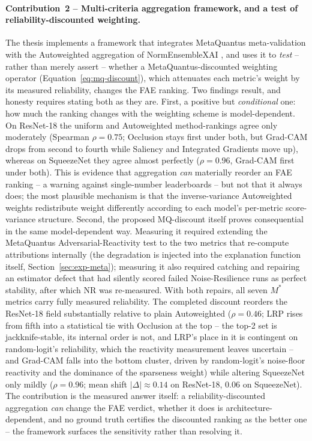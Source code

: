 \paragraph{Contribution~2 -- Multi-criteria aggregation framework, and a test
of reliability-discounted weighting.}
The thesis implements a framework that integrates MetaQuantus meta-validation
\citep{hedstrom2024metaquantus} with the Autoweighted aggregation of
NormEnsembleXAI \citep{hryniewska2024normensemblexai}, and uses it to
\emph{test} -- rather than merely assert -- whether a MetaQuantus-discounted
weighting operator (Equation~\eqref{eq:mq-discount}), which attenuates each
metric's weight by its measured reliability, changes the FAE ranking. Two
findings result, and honesty requires stating both as they are. First, a
positive but \emph{conditional} one: how much the ranking changes with the
weighting scheme is model-dependent. On ResNet-18 the uniform and Autoweighted
method-rankings agree only moderately (Spearman $\rho = 0.75$; Occlusion stays
first under both, but Grad-CAM drops from second to fourth while Saliency and
Integrated Gradients move up), whereas on SqueezeNet they
agree almost perfectly ($\rho = 0.96$, Grad-CAM first under both). This is
evidence that aggregation \emph{can} materially reorder an FAE ranking -- a
warning against
single-number leaderboards -- but not that it always does; the most plausible
mechanism is that the inverse-variance Autoweighted weights redistribute weight
differently according to each model's per-metric score-variance structure.
Second, the proposed MQ-discount itself proves consequential in the same
model-dependent way. Measuring it required extending the MetaQuantus
Adversarial-Reactivity test to the two metrics that re-compute attributions
internally (the degradation is injected into the explanation function
itself, Section~\ref{sec:exp-meta}); measuring it also required catching
and repairing an estimator defect that had silently scored failed
Noise-Resilience runs as perfect stability, after which NR was re-measured.
With both repairs, all seven $M^{*}$
metrics carry fully measured reliability. The completed
discount reorders the
ResNet-18 field substantially relative to plain Autoweighted
($\rho = 0.46$; LRP rises from fifth into a statistical tie with Occlusion
at the top -- the top-2 set is jackknife-stable, its internal order is not,
and LRP's place in it is contingent on random-logit's reliability, which
the reactivity measurement leaves uncertain -- and Grad-CAM falls into the
bottom cluster, driven by
random-logit's noise-floor reactivity and the dominance of the
sparseness weight) while altering SqueezeNet
only mildly ($\rho = 0.96$; mean shift $|\Delta|\approx0.14$ on
ResNet-18, $0.06$ on SqueezeNet). The
contribution is the measured answer itself: a reliability-discounted
aggregation \emph{can} change the FAE verdict, whether it does is
architecture-dependent, and no ground truth certifies the discounted ranking
as the better one -- the framework surfaces the sensitivity rather than
resolving it.

